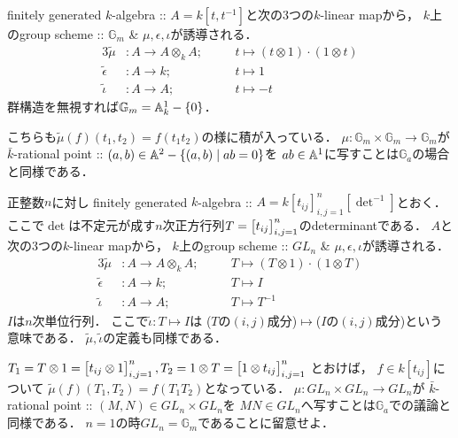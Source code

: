 \documentclass[a4paper]{jsarticle}
\newcommand{\Ga}{\mathbb{G}_a}
\newcommand{\Gm}{\mathbb{G}_m}
\newcommand{\GL}{GL}
\begin{document}
    \begin{Example}
        finitely generated $k$-algebra :: $A=k[t,t^{-1}]$と次の3つの$k$-linear mapから，
        $k$上のgroup scheme :: $\Gm$ \& $\mu,\epsilon,\iota$が誘導される．
        \begin{alignat*}{3}
            \tilde{\mu}&:
                A \to A \otimes_k A; &&
                \quad t \mapsto (t \otimes 1) \cdot (1 \otimes t) \\
            \tilde{\epsilon}&:
                A \to k; &&
                \quad t \mapsto 1 \\
            \tilde{\iota}&:
                A \to A; &&
                \quad t \mapsto -t
        \end{alignat*}
        群構造を無視すれば$\Gm=\affine^1_k-\{0\}$．

        こちらも$\tilde{\mu}(f)(t_1,t_2)=f(t_1t_2)$の様に積が入っている．
        $\mu: \Gm \times \Gm \to \Gm$が
        $\bar{k}$-rational point :: $(a,b) \in \mathbb{A}^2-\{(a,b) \mid ab=0\}$を
        $ab \in \mathbb{A}^1$に写すことは$\Ga$の場合と同様である．
    \end{Example}
    \begin{Example}
        正整数$n$に対し
        finitely generated $k$-algebra :: $A=k[t_{ij}]_{i,j=1}^n [\det^{-1}]$とおく．
        ここで$\det$は不定元が成す$n$次正方行列$T=\begin{bmatrix}t_{ij}\end{bmatrix}_{i,j=1}^n$のdeterminantである．
        $A$と次の3つの$k$-linear mapから，
        $k$上のgroup scheme :: $\GL_n$ \& $\mu,\epsilon,\iota$が誘導される．
        \begin{alignat*}{3}
            \tilde{\mu}&:
                A \to A \otimes_k A; &&
                \quad T \mapsto (T \otimes 1) \cdot (1 \otimes T) \\
            \tilde{\epsilon}&:
                A \to k; &&
                \quad T \mapsto I \\
            \tilde{\iota}&:
                A \to A; &&
                \quad T \mapsto T^{-1}
        \end{alignat*}
        $I$は$n$次単位行列．
        ここで$\tilde{\iota}: T \mapsto I$は
        ($T$の$(i,j)$成分)$\mapsto$($I$の$(i,j)$成分)という意味である．
        $\tilde{\mu}, \tilde{\iota}$の定義も同様である．

        $T_1=T \otimes 1=\begin{bmatrix}t_{ij} \otimes 1\end{bmatrix}_{i,j=1}^n,
        T_2=1 \otimes T=\begin{bmatrix}1 \otimes t_{ij}\end{bmatrix}_{i,j=1}^n$
        とおけば，
        $f \in k[t_{ij}]$について
        $\tilde{\mu}(f)(T_1, T_2)=f(T_1T_2)$となっている．
        $\mu: \GL_n \times \GL_n \to \GL_n$が
        $\bar{k}$-rational point :: $(M,N) \in \GL_n \times \GL_n$を
        $MN \in \GL_n$へ写すことは$\Ga$での議論と同様である．
        $n=1$の時$\GL_n=\Gm$であることに留意せよ．
    \end{Example}
\end{document}
